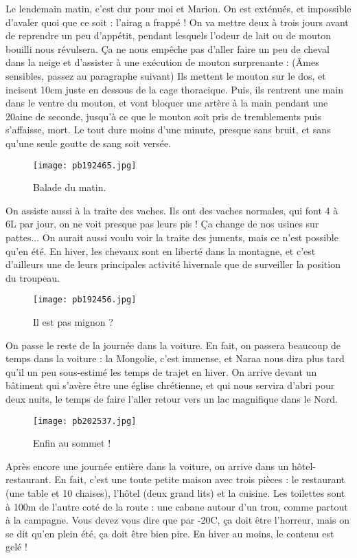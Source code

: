 \documentclass{book}
\begin{document}
Le lendemain matin, c'est dur pour moi et Marion. On est exténués, et impossible d'avaler quoi que ce soit : l'airag a frappé ! On va mettre deux à trois jours avant de reprendre un peu d'appétit, pendant lesquels l'odeur de lait ou de mouton bouilli nous révulsera. Ça ne nous empêche pas d'aller faire un peu de cheval dans la neige et d'assister à une exécution de mouton surprenante : (Âmes sensibles, passez au paragraphe suivant) Ils mettent le mouton sur le dos, et incisent 10cm juste en dessous de la cage thoracique. Puis, ils rentrent une main dans le ventre du mouton, et vont bloquer une artère à la main pendant une 20aine de seconde, jusqu'à ce que le mouton soit pris de tremblements puis s'affaisse, mort. Le tout dure moins d'une minute, presque sans bruit, et sans qu'une seule goutte de sang soit versée.


\begin{figure}[h]
\centering
\texttt{[image: pb192465.jpg]}
\caption*{ Balade du matin.}
\end{figure}

On assiste aussi à la traite des vaches. Ils ont des vaches normales, qui font 4 à 6L par jour, on ne voit presque pas leurs pis ! Ça change de nos usines sur pattes... On aurait aussi voulu voir la traite des juments, mais ce n'est possible qu'en été. En hiver, les chevaux sont en liberté dans la montagne, et c'est d'ailleurs une de leurs principales activité hivernale que de surveiller la position du troupeau.


\begin{figure}[h]
\centering
\texttt{[image: pb192456.jpg]}
\caption*{ Il est pas mignon ?}
\end{figure}

On passe le reste de la journée dans la voiture. En fait, on passera beaucoup de temps dans la voiture : la Mongolie, c'est immense, et Naraa nous dira plus tard qu'il un peu sous-estimé les temps de trajet en hiver. On arrive devant un bâtiment qui s'avère être une église chrétienne, et qui nous servira d'abri pour deux nuits, le temps de faire l'aller retour vers un lac magnifique dans le Nord.


\begin{figure}[h]
\centering
\texttt{[image: pb202537.jpg]}
\caption*{ Enfin au sommet !}
\end{figure}

Après encore une journée entière dans la voiture, on arrive dans un hôtel-restaurant. En fait, c'est une toute petite maison avec trois pièces : le restaurant (une table et 10 chaises), l'hôtel (deux grand lits) et la cuisine. Les toilettes sont à 100m de l'autre coté de la route : une cabane autour d'un trou, comme partout à la campagne. Vous devez vous dire que par -20\textdegree C, ça doit être l'horreur, mais on se dit qu'en plein été, ça doit être bien pire. En hiver au moins, le contenu est gelé !
\end{document}
